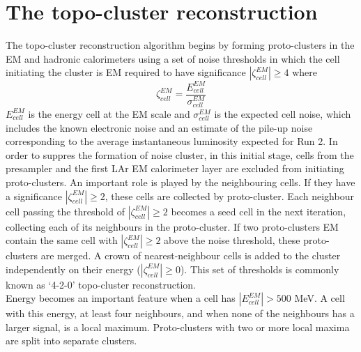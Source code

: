 \documentclass[a4paper, oneside]{book}
\begin{document}
		\section{The topo-cluster reconstruction}
		The topo-cluster reconstruction algorithm begins by forming proto-clusters in the EM and hadronic calorimeters using a set of noise thresholds in which the cell initiating the cluster is EM required to have significance $|\zeta_{cell}^{EM}| \geq 4$ where 
		$$
		\zeta_{cell}^{EM} = \frac{E_{cell}^{EM}}{\sigma_{cell}^{EM}}
		$$		
		$E_{cell}^{EM}$ is the energy cell at the EM scale and $\sigma_{cell}^{EM}$ is the expected cell noise, which includes the known electronic noise and an estimate of the pile-up noise corresponding
		to the average instantaneous luminosity expected for Run 2. In order to suppres the formation of noise cluster, in this initial stage, cells from the presampler and the first LAr EM calorimeter layer are excluded from initiating proto-clusters.
		An important role is played by the neighbouring cells. If they have a significance $|\zeta_{cell}^{EM}| \geq 2$, these cells are collected by proto-cluster. Each neighbour cell passing the threshold of $|\zeta_{cell}^{EM}| \geq 2$ becomes a seed cell in the next iteration, collecting each of its neighbours in the proto-cluster. If two proto-clusters EM contain the same cell with $|\zeta_{cell}^{EM}| \geq 2$ above the noise threshold, these proto-clusters are merged. A crown of nearest-neighbour cells is added to the cluster independently on their energy ($|\zeta_{cell}^{EM}| \geq 0$). This set of thresholds is commonly known as ‘4-2-0’ topo-cluster reconstruction.\\
		Energy becomes an important feature when a cell has $|E_{cell}^{EM}| > 500$ MeV. A cell with this energy, at least four neighbours, and when none of the neighbours has a larger signal, is a local maximum. Proto-clusters with two or more local maxima are split into separate clusters.
		
		
\end{document}
